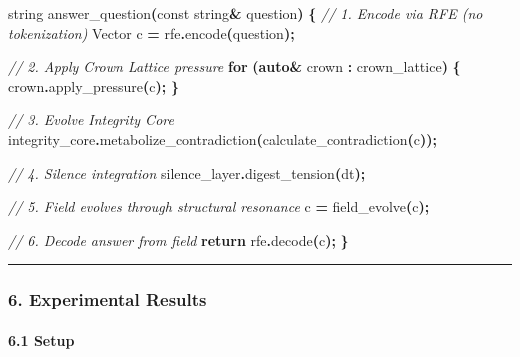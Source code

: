 \documentclass[
  11pt,
  a4paper,
]{article}
\newenvironment{Shaded}{\begin{snugshade}}{\end{snugshade}}
\newcommand{\AttributeTok}[1]{\textcolor[rgb]{0.13,0.29,0.53}{#1}}
\newcommand{\CommentTok}[1]{\textcolor[rgb]{0.56,0.35,0.01}{\textit{#1}}}
\newcommand{\ControlFlowTok}[1]{\textcolor[rgb]{0.13,0.29,0.53}{\textbf{#1}}}
\newcommand{\KeywordTok}[1]{\textcolor[rgb]{0.13,0.29,0.53}{\textbf{#1}}}
\newcommand{\NormalTok}[1]{#1}
\newcommand{\OperatorTok}[1]{\textcolor[rgb]{0.81,0.36,0.00}{\textbf{#1}}}
\begin{document}
\begin{Shaded}
\begin{Highlighting}[]
\NormalTok{string answer\_question}\OperatorTok{(}\AttributeTok{const}\NormalTok{ string}\OperatorTok{\&}\NormalTok{ question}\OperatorTok{)} \OperatorTok{\{}
    \CommentTok{// 1. Encode via RFE (no tokenization)}
\NormalTok{    Vector c }\OperatorTok{=}\NormalTok{ rfe}\OperatorTok{.}\NormalTok{encode}\OperatorTok{(}\NormalTok{question}\OperatorTok{);}
    
    \CommentTok{// 2. Apply Crown Lattice pressure}
    \ControlFlowTok{for} \OperatorTok{(}\KeywordTok{auto}\OperatorTok{\&}\NormalTok{ crown }\OperatorTok{:}\NormalTok{ crown\_lattice}\OperatorTok{)} \OperatorTok{\{}
\NormalTok{        crown}\OperatorTok{.}\NormalTok{apply\_pressure}\OperatorTok{(}\NormalTok{c}\OperatorTok{);}
    \OperatorTok{\}}
    
    \CommentTok{// 3. Evolve Integrity Core}
\NormalTok{    integrity\_core}\OperatorTok{.}\NormalTok{metabolize\_contradiction}\OperatorTok{(}\NormalTok{calculate\_contradiction}\OperatorTok{(}\NormalTok{c}\OperatorTok{));}
    
    \CommentTok{// 4. Silence integration}
\NormalTok{    silence\_layer}\OperatorTok{.}\NormalTok{digest\_tension}\OperatorTok{(}\NormalTok{dt}\OperatorTok{);}
    
    \CommentTok{// 5. Field evolves through structural resonance}
\NormalTok{    c }\OperatorTok{=}\NormalTok{ field\_evolve}\OperatorTok{(}\NormalTok{c}\OperatorTok{);}
    
    \CommentTok{// 6. Decode answer from field}
    \ControlFlowTok{return}\NormalTok{ rfe}\OperatorTok{.}\NormalTok{decode}\OperatorTok{(}\NormalTok{c}\OperatorTok{);}
\OperatorTok{\}}
\end{Highlighting}
\end{Shaded}

\begin{center}\rule{0.5\linewidth}{0.5pt}\end{center}

\subsubsection{6. Experimental Results}\label{experimental-results-2}

\paragraph{6.1 Setup}\label{setup-1}
\end{document}
